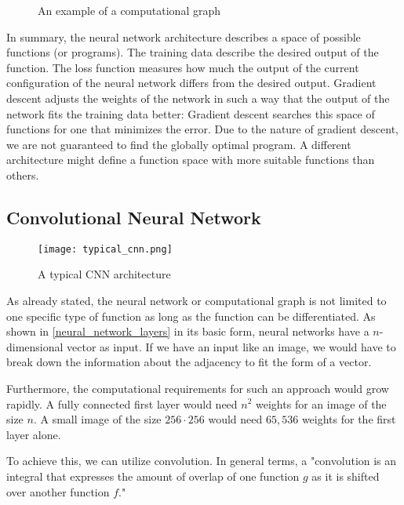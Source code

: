 \begin{figure}[!h]
    \centering
    \caption{An example of a computational graph \cite{colah_calculus_nodate}}
    \label{computational_graph}
\end{figure}

In summary, the neural network architecture describes a space of possible functions (or programs). The training data describe the desired output of the function. The loss function measures how much the output of the current configuration of the neural network differs from the desired output. Gradient descent adjusts the weights of the network in such a way that the output of the network fits the training data better: Gradient descent searches this space of functions for one that minimizes the error. Due to the nature of gradient descent, we are not guaranteed to find the globally optimal program. A different architecture might define a function space with more suitable functions than others.

\subsection{Convolutional Neural Network}
\begin{figure}
    \centering
    \texttt{[image: typical\_cnn.png]}
    \caption{A typical CNN architecture \cite{noauthor_convolutional_2022}}
    \label{typical_cnn}
\end{figure}

As already stated, the neural network or computational graph is not limited to one specific type of function as long as the function can be differentiated. As shown in \ref{neural_network_layers} in its basic form, neural networks have a $n$-dimensional vector as input. If we have an input like an image, we would have to break down the information about the adjacency to fit the form of a vector.

Furthermore, the computational requirements for such an approach would grow rapidly. A fully connected first layer would need $n^2$ weights for an image of the size $n$. A small image of the size $ 256 \cdot 256$ would need $65,536$ weights for the first layer alone.

To achieve this, we can utilize convolution. In general terms, a "convolution is an integral that expresses the amount of overlap of one function $g$ as it is shifted over another function $f$." \cite{weisstein_convolution_nodate}

